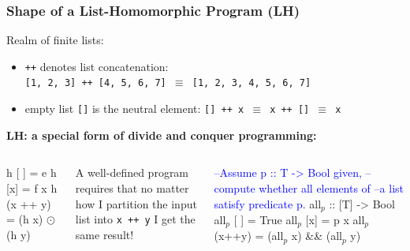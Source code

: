 \documentclass{beamer}
\newcommand{\blue}[1]{\textcolor{Blue}{{#1}}}
\newcommand{\emp}[1]{\textcolor{DikuRed}{ #1}}
\newcommand{\mymath}[1]{$ #1 $}
\newcommand{\myindx}[1]{_{#1}}
\begin{document}
\begin{frame}[fragile,t]
\frametitle{Shape of a List-Homomorphic Program (LH)}

Realm of finite lists:
\begin{itemize}
    \item {\tt ++} denotes list concatenation:\\
    {\tt [1, 2, 3] ++ [4, 5, 6, 7] $\equiv$ [1, 2, 3, 4, 5, 6, 7]}
    \item empty list {\tt []} is the neutral element:
        {\tt [] ++ x $\equiv$ x ++ [] $\equiv$ x}
\end{itemize}
\bigskip

\emp{\bf LH: a special form of divide and conquer programming:}
\begin{columns}
\begin{colorcode}[fontsize=\small]
h [ ]   = e
h [x]   = f x
h (x ++ y) = (h x) \mymath{\odot} (h y)
\end{colorcode}
\alert{A well-defined program requires that no matter how 
I partition the input list into {\tt x ++ y} I get the same result!}
\begin{colorcode}[fontsize=\small]
\blue{--Assume p :: T -> Bool given,}
\blue{--compute whether all elements of}
\blue{--a list satisfy predicate p.}
all\mymath{\myindx{p}} :: [T] -> Bool
all\mymath{\myindx{p}} [ ]  = True
all\mymath{\myindx{p}} [x]  = p x 
all\mymath{\myindx{p}} (x++y) = (all\mymath{\myindx{p}} x) && (all\mymath{\myindx{p}} y)
\end{colorcode}
\end{columns}

\end{frame}
\end{document}
